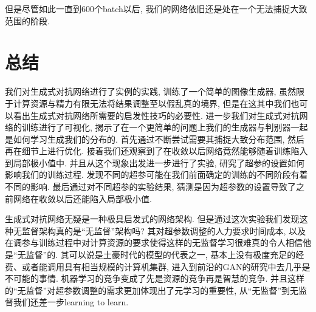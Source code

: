 \documentclass[lang=cn,11pt]{elegantpaper}
\begin{document}
但是尽管如此一直到600个batch以后, 我们的网络依旧还是处在一个无法捕捉大致范围的阶段.

\section{总结}

我们对生成式对抗网络进行了实例的实践, 训练了一个简单的图像生成器, 虽然限于计算资源与精力有限无法将结果调整至以假乱真的境界, 但是在这其中我们也可以看出生成式对抗网络所需要的启发性技巧的必要性. 进一步我们对生成式对抗网络的训练进行了可视化, 揭示了在一个更简单的问题上我们的生成器与判别器一起是如何学习生成我们的分布的. 首先通过不断尝试需要其捕捉大致分布范围, 然后再在细节上进行优化. 接着我们还观察到了在收敛以后网络竟然能够随着训练陷入到局部极小值中. 并且从这个现象出发进一步进行了实验, 研究了超参的设置如何影响我们的训练过程. 发现不同的超参可能在我们前面确定的训练的不同阶段有着不同的影响. 最后通过对不同超参的实验结果, 猜测是因为超参数的设置导致了之前网络在收敛以后还能陷入局部极小值. 

生成式对抗网络无疑是一种极具启发式的网络架构. 但是通过这次实验我们发现这种无监督架构真的是“无监督”架构吗? 其对超参数调整的人力要求时间成本, 以及在调参与训练过程中对计算资源的要求使得这样的无监督学习很难真的令人相信他是“无监督”的. 其可以说是土豪时代的模型的代表之一, 基本上没有极度充足的经费、或者能调用具有相当规模的计算机集群, 进入到前沿的GAN的研究中去几乎是不可能的事情. 机器学习的竞争变成了先是资源的竞争再是智慧的竞争. 并且这样的“无监督”对超参数调整的需求更加体现出了元学习的重要性, 从“无监督”到无监督我们还差一步learning to learn.


\newpage
\nocite{*}



\end{document}
